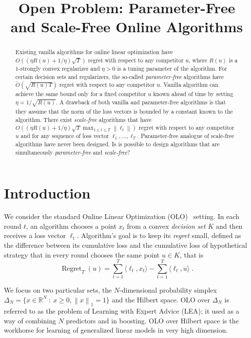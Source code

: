 \documentclass{colt2016} %
\title{Open Problem: Parameter-Free and Scale-Free Online Algorithms}
\DeclareMathOperator{\Regret}{Regret}
\newcommand{\R}{\mathbb{R}}     %
\newcommand{\norm}[1]{\left\|{#1}\right\|}
\begin{document}
\maketitle

\begin{abstract}
Existing vanilla algorithms for online linear optimization have $O((\eta R(u) +
1/\eta) \sqrt{T})$ regret with respect to any competitor $u$, where $R(u)$ is a
$1$-strongly convex regularizer and $\eta > 0$ is a tuning parameter of the
algorithm. For certain decision sets and regularizers, the so-called
\emph{parameter-free} algorithms have $\widetilde O(\sqrt{R(u) T})$ regret with
respect to any competitor $u$.  Vanilla algorithm can achieve the same bound
only for a fixed competitor $u$ known ahead of time by setting $\eta =
1/\sqrt{R(u)}$. A drawback of both vanilla and parameter-free algorithms is
that they assume that the norm of the loss vectors is bounded by a constant
known to the algorithm. There exist \emph{scale-free} algorithms that have
$O((\eta R(u) + 1/\eta) \sqrt{T} \max_{1 \le t \le T} \norm{\ell_t})$ regret
with respect to any competitor $u$ and for any sequence of loss vector $\ell_1,
\dots, \ell_T$. Parameter-free analogue of scale-free algorithms have never
been designed. Is is possible to design algorithms that are simultaneously
\emph{parameter-free} and \emph{scale-free}?
\end{abstract}

\section{Introduction}

We consider the standard Online Linear Optimization (OLO)~\citep{Cesa-Bianchi-Lugosi-2006,
Shalev-Shwartz-2011} setting. In each round $t$, an algorithm chooses a point $x_t$ from a convex \emph{decision set}
$K$ and then receives a loss vector $\ell_t$. Algorithm's goal is to keep its
\emph{regret} small, defined as the difference between its cumulative loss and the cumulative loss of hypothetical strategy that
in every round chooses the same point $u \in K$, that is
$$
\Regret_T(u) = \sum_{t=1}^T \langle \ell_t, x_t \rangle - \sum_{t=1}^T \langle \ell_t, u \rangle \; .
$$

We focus on two particular sets, the $N$-dimensional probability simplex
$\Delta_N = \{ x \in \R^N ~:~ x \ge 0, \norm{x}_1 = 1\}$ and the Hilbert space.
OLO over $\Delta_N$ is referred to as the problem of Learning with Expert
Advice (LEA); it used as a way of combining $N$ predictors and in boosting. OLO
over Hilbert space is the workhorse for learning of generalized linear models
in very high dimension.
\end{document}
